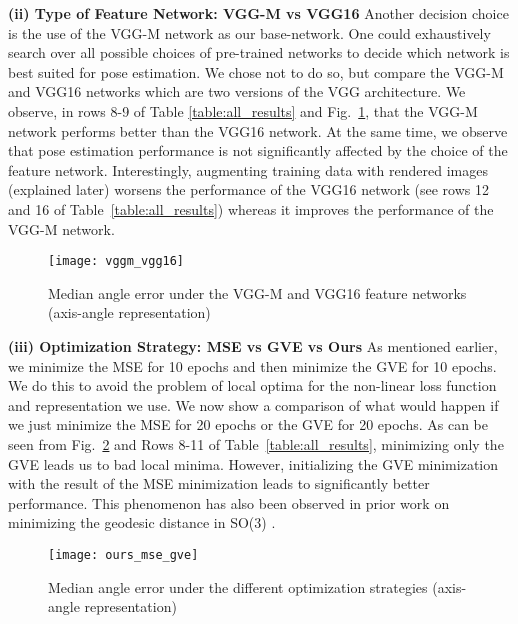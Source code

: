 \documentclass[10pt,twocolumn,letterpaper]{article}
\newcommand{\myparagraph}[1]{\smallskip\noindent\textbf{#1}}
\begin{document}
	\myparagraph{(ii) Type of Feature Network: VGG-M vs VGG16}
	Another decision choice is the use of the VGG-M network as our base-network. One could 
	exhaustively search over all possible choices of pre-trained networks to decide which network 
	is best suited for pose estimation. We chose not to do so, but compare the VGG-M and VGG16 
	networks which are two versions of the VGG architecture. We observe, in rows 8-9 of Table 
	\ref{table:all_results} and Fig.~\ref{fig:vggm_vgg16}, that the VGG-M network performs better than the VGG16 network. At the same time, we observe that pose estimation performance is not significantly affected by the choice of the feature network. Interestingly, augmenting training data with rendered images (explained later) worsens the performance of the VGG16 network (see rows 12 and 16 of Table~\ref{table:all_results}) whereas it improves the performance of the VGG-M network. 
	\begin{figure}[h]
		\centering
		\texttt{[image: vggm\_vgg16]}
		\caption{Median angle error under the VGG-M and VGG16 feature networks (axis-angle representation)}
		\label{fig:vggm_vgg16}
	\end{figure}
	
	\myparagraph{(iii) Optimization Strategy: MSE vs GVE vs Ours}
	As mentioned earlier, we minimize the MSE for 10 epochs and then minimize the GVE for 10 epochs. We do this to avoid the problem of local optima for the non-linear loss function and representation we use. We now show a comparison of what would happen if we just minimize the MSE for 20 epochs or the GVE for 20 epochs. As can be seen from Fig.~\ref{fig:ours_mse_gve} and Rows 8-11 of Table~\ref{table:all_results}, minimizing only the GVE leads us to bad local minima. However, initializing the GVE minimization with the result of the MSE minimization leads to significantly better performance. This phenomenon has also been observed in prior work on minimizing the geodesic distance in SO(3) \cite{Tron:CDC09}.
	\begin{figure}[h]
		\centering
		\texttt{[image: ours\_mse\_gve]}
		\caption{Median angle error under the different optimization strategies (axis-angle representation)}
		\label{fig:ours_mse_gve}
	\end{figure}
\end{document}
